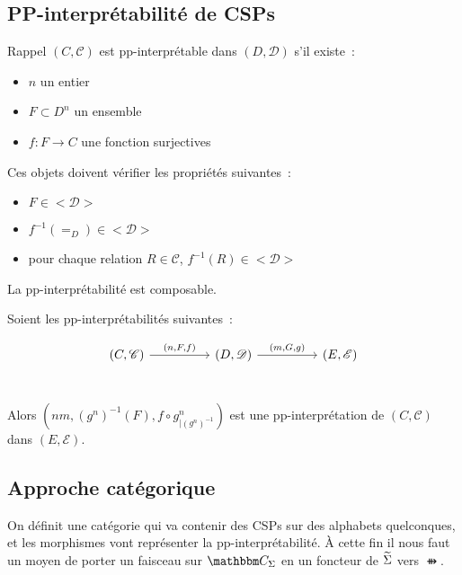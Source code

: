 
\subsection{PP-interprétabilité de CSPs}

\begin{defi}{Rappel}\label{ppInterDef}
    $(C,\mathscr{C})$ est pp-interprétable dans $(D,\mathscr{D})$ s'il existe~:
    \begin{itemize}
        \item $n$ un entier
        \item $F\subset D^n$ un ensemble
        \item $f : F\rightarrow C$ une fonction surjectives
    \end{itemize}

    Ces objets doivent vérifier les propriétés suivantes~:\begin{itemize}
        \item $F\in<\mathscr{D}>$
        \item $f^{-1}(=_D)\in<\mathscr{D}>$
        \item pour chaque relation $R\in\mathscr{C}$, $f^{-1}(R)\in<\mathscr{D}>$
    \end{itemize}
\end{defi}

\begin{lem}
    La pp-interprétabilité est composable.
\end{lem}

\begin{pv}
    Soient les pp-interprétabilités suivantes~:

    \[\begin{tikzcd}
        (C,\mathscr{C})\arrow[rr, "{(n,F,f)}"] & &
        (D,\mathscr{D})\arrow[rr, "{(m,G,g)}"] & &
        (E,\mathscr{E}) \\
    \end{tikzcd}\]

    Alors $(nm, (g^n)^{-1}(F), f\circ g^n_{|(g^n)^{-1}})$ est une pp-interprétation
    de $(C,\mathscr{C})$ dans $(E,\mathscr{E})$.
\end{pv}

\subsection{Approche catégorique}

On définit une catégorie qui va contenir des CSPs sur des alphabets quelconques,
et les morphismes vont représenter la pp-interprétabilité. À cette fin il nous
faut un moyen de porter un faisceau sur $\C_\Sigma$ en un foncteur de $\widetilde{\Sigma}$
vers $\ffun$.

